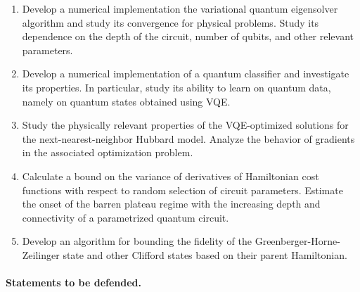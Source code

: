 \begin{enumerate}
    \item Develop a numerical implementation the variational quantum eigensolver algorithm and study its convergence for physical problems. Study its dependence on the depth of the circuit, number of qubits, and other relevant parameters.
    \item Develop a numerical implementation of a quantum classifier and investigate its properties. In particular, study its ability to learn on quantum data, namely on quantum states obtained using VQE.
    \item Study the physically relevant properties of the VQE-optimized solutions for the next-nearest-neighbor Hubbard model. Analyze the behavior of gradients in the associated optimization problem.
    \item Calculate a bound on the variance of derivatives of Hamiltonian cost functions with respect to random selection of circuit parameters. Estimate the onset of the barren plateau regime with the increasing depth and connectivity of a parametrized quantum circuit.
    \item Develop an algorithm for bounding the fidelity of the Greenberger-Horne-Zeilinger state and other Clifford states based on their parent Hamiltonian.
\end{enumerate}

\paragraph{Statements to be defended.}

